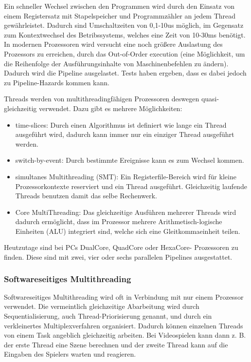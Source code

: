 \documentclass[12pt,a4paper]{report}
\begin{document}
\begin{onehalfspace}
Ein schneller Wechsel zwischen den Programmen wird durch den Einsatz von einem Registersatz mit Stapelspeicher und Programmzähler an jedem Thread gewährleistet. Dadurch sind Umschaltzeiten von 0,1-10us möglich, im Gegensatz zum Kontextwechsel des Betribssystems, welches eine Zeit von 10-30ms benötigt.\\

In modernen Prozessoren wird versucht eine noch größere Auslastung des Prozessors zu erreichen, durch das Out-of-Order execution (eine Möglichkeit, um die Reihenfolge der Ausführungsinhalte von Maschinenbefehlen zu ändern). Dadurch wird die Pipeline ausgelastet. Tests haben ergeben, dass es dabei jedoch zu Pipeline-Hazards kommen kann.

Threads werden von multithreadingfähigen Prozessoren deswegen quasi-gleichzeitig verwendet. Dazu gibt es mehrere Möglichkeiten:
\begin{itemize}
\item time-slices: Durch einen Algorithmus ist definiert wie lange ein Thread ausgeführt wird, dadurch kann immer nur ein einziger Thread ausgeführt werden.
\item switch-by-event: Durch bestimmte Ereignisse kann es zum Wechsel kommen.
\item simultanes Multithreading (SMT): Ein Registerfile-Bereich wird für kleine Prozessorkontexte reserviert und ein Thread ausgeführt. Gleichzeitig laufende Threads benutzen damit das selbe Rechenwerk.
\item Core MultiThreading: Das gleichzeitige Ausführen mehrerer Threads wird dadurch ermöglicht, dass im Prozessor mehrere Arithmetisch-logische Einheiten (ALU) integriert sind, welche sich eine Gleitkommaeinheit teilen.
\end{itemize}
Heutzutage sind bei PCs DualCore, QuadCore oder HexaCore- Prozessoren zu finden. Diese sind mit zwei, vier oder sechs parallelen Pipelines ausgestattet.


\subsubsection{Softwareseitiges Multithreading}
Softwareseitiges Multithreading wird oft in Verbindung mit nur einem Prozessor verwendet. Die vermeintlich gleichzeitige Abarbeitung wird durch Sequentialisierung, auch Thread-Priorisierung genannt, und durch ein verkleinertes Multiplexverfahren organisiert. Dadurch können einzelnen Threads von einem Task angeblich gleichzeitig arbeiten. Bei Videospielen kann dann z. B. der erste Thread eine Szene berechnen und der zweite Thread kann auf die Eingaben des Spielers warten und reagieren.\\


\end{onehalfspace}
\end{document}

